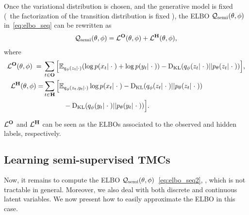 Once the variational distribution is chosen, and the generative model is fixed
(\ie~the factorization of the transition distribution
is fixed
), 
the ELBO $\mathcal{Q}_{\mathrm{semi}}(\theta,\phi)$ in~\eqref{eq:elbo_seq} can be rewritten as
\begin{align}
\label{eq:elbo_seq2}
\Qsemi(\theta,\phi) = %
\L^{\LL}(\theta,\phi) + \L^{\U}(\theta,\phi) \text{,}
\end{align}
where
\begin{align}
\label{eq:elbo_seq_obs}
\mathcal{L}^{\mathbf{O}}(\theta,\phi) \;=\; &  \sum_{\substack{ t \in \mathbf{O}} } \Big[ 
{\mathbb{E}}_{q_\phi(z_{t}| \cdot ) } (\log p(x_t| \; \cdot \; )
+\log p(y_t| \; \cdot \; ))
- \mathrm{D}_{\mathrm{KL}} (q_\phi(z_{t}|\; \cdot \; )|| p_{\theta}(z_{t}|\; \cdot \; )) 
\Big] \text{,} \\ 
\label{eq:elbo_seq_hidden}
\mathcal{L}^{\mathbf{H}}(\theta,\phi) = & \sum_{\substack{ t \in \mathbf{H}} } \Big[
{\mathbb{E}}_{q_\phi(z_{t}, y_{t}| \cdot ) } \log p(x_t| \; \cdot \; )
- \mathrm{D}_{\mathrm{KL}} (q_\phi(z_{t}|\; \cdot \; )|| p_{\theta}(z_{t}|\; \cdot \; ))
\nonumber \\& \quad  \quad \quad
- \mathrm{D}_{\mathrm{KL}} (q_\phi(y_{t}|\; \cdot \; )|| p_{\theta}(y_{t}|\; \cdot \; ))
\Big] \text{.}
\end{align}

$\mathcal{L}^{\mathbf{O}}$ and $\mathcal{L}^{\mathbf{H}}$ can be seen as the ELBOs associated to the 
observed and hidden labels, respectively.



\subsection{Learning semi-supervised TMCs}
Now, it remains to compute the ELBO 
$\mathcal{Q}_{\mathrm{semi}}(\theta,\phi)$~\eqref{eq:elbo_seq2}, ,
which is not tractable in general.
Moreover, we also deal with both discrete and continuous latent variables. 
We now present how to easily approximate the ELBO
in this case.


